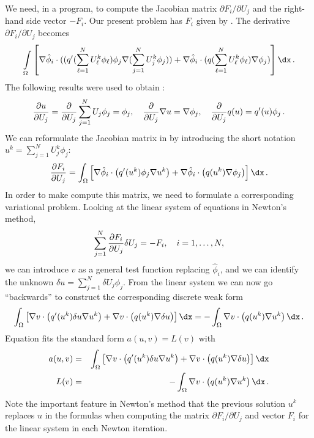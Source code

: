 We need, in a program, to compute the Jacobian 
matrix $\partial F_i/\partial U_j$
and the right-hand side vector $-F_i$.
Our present problem has $F_i$ given by .
The derivative $\partial F_i/\partial U_j$ becomes
\begin{equation}
\int\limits_\Omega \left\lbrack
\nabla \hat\phi_i\cdot(( q'(\sum_{\ell=1}^NU_\ell^k\phi_\ell)\phi_j
\nabla (\sum_{j=1}^NU_j^k\phi_j))
+
\nabla \hat\phi_i\cdot ( q(\sum_{\ell=1}^NU_\ell^k\phi_\ell)
\nabla \phi_j )
\right\rbrack
\dx\langtangenep
\label{langtangen:poisson:nonlinear:dFdU}
\end{equation}
The following results were used to obtain :
\begin{equation}
{\partial u\over\partial U_j} = {\partial\over\partial U_j}
\sum_{j=1}^NU_j\phi_j = \phi_j,\quad {\partial\over\partial U_j}\nabla u = \nabla\phi_j,\quad {\partial\over\partial U_j}q(u) = q'(u)\phi_j\thinspace .
\end{equation}
We can reformulate the Jacobian matrix 
in  by introducing the short
notation $u^k = \sum_{j=1}^NU_j^k\phi_j$:
\begin{equation}
{\partial F_i\over\partial U_j} = 
\int_\Omega \left\lbrack
\nabla \hat\phi_i\cdot\left( q'(u^k)\phi_j
\nabla u^k \right)
+
\nabla \hat\phi_i\cdot\left( q(u^k)
\nabla \phi_j \right)
\right\rbrack
\dx\langtangenep
\end{equation}
In order to make \fenics{} compute this matrix, we need to formulate a 
corresponding variational problem. Looking at the
linear system of equations in Newton's method,
\[ \sum_{j=1}^N {\partial F_i\over\partial U_j}\delta U_j = -F_i,\quad
i=1,\ldots,N,\]
we can introduce $v$ as a general test function replacing $\hat\phi_i$,
and we can identify the unknown
$\delta u = \sum_{j=1}^N\delta U_j\phi_j$. From the linear system
we can now go ``backwards'' to construct the corresponding 
discrete weak form
\begin{equation}
\label{langtangen:nonlinear:Newton:aLF}
\int_\Omega \left\lbrack
\nabla v\cdot\left( q'(u^k)\delta u
\nabla u^k \right)
+
\nabla v\cdot\left( q(u^k)
\nabla \delta u \right)
\right\rbrack
\dx = - \int_\Omega \nabla v\cdot\left( q(u^k)
\nabla u^k\right) \dx\langtangenep
\end{equation}
Equation  fits the standard form
$a(u,v)=L(v)$ with
\begin{eqnarray*}
a(u,v) &=& 
\int_\Omega \left\lbrack
\nabla v\cdot\left( q'(u^k)\delta u
\nabla u^k \right)
+
\nabla v\cdot\left( q(u^k)
\nabla \delta u \right)
\right\rbrack
\dx\\
L(v) &=& - \int_\Omega \nabla v\cdot\left( q(u^k)
\nabla u^k\right) \dx\langtangenep
\end{eqnarray*}
Note the important feature in Newton's method 
that the 
previous solution $u^k$ replaces $u$
in the formulas when computing the matrix
$\partial F_i/\partial U_j$ and vector $F_i$ for the linear system in
each Newton iteration.

